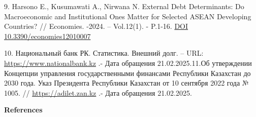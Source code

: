 \begin{references}
9. Harsono E., Kusumawati A., Nirwana N. External Debt Determinants: Do
Macroeconomic and Institutional Ones Matter for Selected ASEAN
Developing Countries? // Economies. -2024. -- Vol.12(1). - P.1-16.
\href{https://doi.org/10.3390/economies12010007}{DOI
10.3390/economies12010007}

10. Национальный банк РК. Статистика. Внешний долг. -- URL:
\href{https://www.nationalbank.kz/ru/news/vneshniy-dolg}{https://www.nationalbank.kz}
.- Дата обращения 21.02.2025.11.Об утверждении Концепции управления
государственными финансами Республики Казахстан до 2030 года. Указ
Президента Республики Казахстан от 10 сентября 2022 года № 1005. //
\href{https://adilet.zan.kz/rus/docs/U2200001005}{https://adilet.zan.kz} .- Дата обращения
21.02.2025. 
\end{references}

\begin{center}
{\bfseries References}
\end{center}

